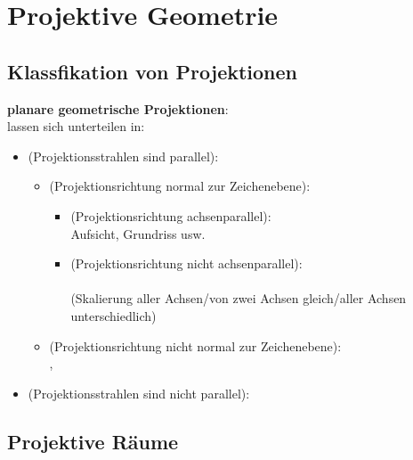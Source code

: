 \chapter{%
    Projektive Geometrie%
}

\section{%
    Klassfikation von Projektionen%
}

\textbf{planare geometrische Projektionen}:\\
 lassen sich unterteilen in:
\begin{itemize}
    \item
     (Projektionsstrahlen sind parallel):
    \begin{itemize}
        \item
         (Projektionsrichtung normal zur Zeichenebene):
        \begin{itemize}
            \item
             (Projektionsrichtung achsenparallel):\\
            Aufsicht, Grundriss usw.

            \item
            (Projektionsrichtung nicht achsenparallel):\\
            \\
            (Skalierung aller Achsen/von zwei Achsen gleich/aller Achsen unterschiedlich)
        \end{itemize}

        \item
         (Projektionsrichtung nicht normal zur Zeichenebene):\\
        , 
    \end{itemize}

    \item
     (Projektionsstrahlen sind nicht parallel):\\
\end{itemize}

\section{%
    Projektive Räume%
}

